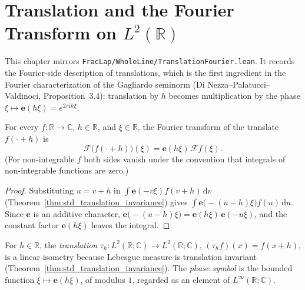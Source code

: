 \chapter{Translation and the Fourier Transform on $L^2(\mathbb{R})$}

This chapter mirrors \texttt{FracLap/WholeLine/TranslationFourier.lean}. It records the Fourier-side description of translations, which is the first ingredient in the Fourier characterization of the Gagliardo seminorm (Di Nezza--Palatucci--Valdinoci, Proposition~3.4): translation by $h$ becomes multiplication by the phase $\xi \mapsto \mathbf{e}(h \xi) = e^{2 \pi \mathrm{i} h \xi}$.

\begin{lemma}\label{lem:fourier_translate_real}
\leanok
For every $f : \mathbb{R} \to \mathbb{C}$, $h \in \mathbb{R}$, and $\xi \in \mathbb{R}$, the Fourier transform of the translate $f(\cdot + h)$ is
\[
  \mathcal{F}\bigl(f(\cdot + h)\bigr)(\xi) = \mathbf{e}(h \xi)\, \mathcal{F} f(\xi).
\]
(For non-integrable $f$ both sides vanish under the convention that integrals of non-integrable functions are zero.)
\end{lemma}

\begin{proof}
\leanok
Substituting $u = v + h$ in $\int \mathbf{e}(-v \xi) f(v + h) \, \mathrm{d}v$ (Theorem~\ref{thm:std_translation_invariance}) gives $\int \mathbf{e}\bigl(-(u - h) \xi\bigr) f(u) \, \mathrm{d}u$. Since $\mathbf{e}$ is an additive character, $\mathbf{e}\bigl(-(u - h)\xi\bigr) = \mathbf{e}(h \xi)\, \mathbf{e}(-u \xi)$, and the constant factor $\mathbf{e}(h \xi)$ leaves the integral.
\end{proof}

\begin{definition}\label{def:translate_l2}
\leanok
For $h \in \mathbb{R}$, the \emph{translation} $\tau_h : L^2(\mathbb{R}; \mathbb{C}) \to L^2(\mathbb{R}; \mathbb{C})$, $(\tau_h f)(x) = f(x + h)$, is a linear isometry because Lebesgue measure is translation invariant (Theorem~\ref{thm:std_translation_invariance}). The \emph{phase symbol} is the bounded function $\xi \mapsto \mathbf{e}(h \xi)$, of modulus $1$, regarded as an element of $L^\infty(\mathbb{R}; \mathbb{C})$.
\end{definition}

